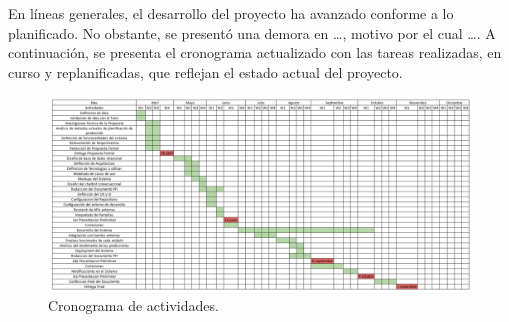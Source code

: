 
En líneas generales, el desarrollo del proyecto ha avanzado conforme a lo planificado. No obstante, se presentó una demora en \ldots, motivo por el cual \ldots. A continuación, se presenta el cronograma actualizado con las tareas realizadas, en curso y replanificadas, que reflejan el estado actual del proyecto.

\begin{figure}[ht]
    \centering
    \includegraphics[width=0.7\textheight]{./././images/Cronograma.png}
    \caption{Cronograma de actividades.}
\end{figure}